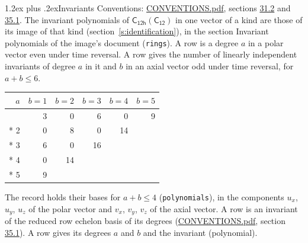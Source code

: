 \documentclass[10pt,a4paper]{article}
\makeatletter
\renewcommand\section{\@startsection{section}{1}{\z@}{-3ex plus -1ex minus -.2ex}%
  {1.2ex plus .2ex}{\normalfont\large\sffamily\bfseries\color{parttitle}}}
\numberwithin{equation}{section}
\newcommand{\grp}[1]{\mathsf{#1}}
\makeatother
\begin{document}
\section{Invariants}\label{s:invariants}
Conventions: \href{../../CONVENTIONS.pdf}{CONVENTIONS.pdf}, sections \href{../../CONVENTIONS.pdf\#conv.31.2}{31.2} and \href{../../CONVENTIONS.pdf\#conv.35.1}{35.1}.
The invariant polynomials of $\grp{C_{12h}}(\grp{C_{12}})$ in one vector of a kind are those of its image of that kind (section~\ref{s:identification}), in the section Invariant polynomials of the image's document (\texttt{rings}).
\leavevmode\label{n:index.degree.polar}\label{n:index.degree.axial}A row is a degree $a$ in a polar vector even under time reversal. A row gives the number of linearly independent invariants of degree $a$ in it and $b$ in an axial vector odd under time reversal, for $a + b \le 6$.
{\small\begin{longtable}{@{}rrrrrr@{}}\toprule
$a$ & $b = 1$ & $b = 2$ & $b = 3$ & $b = 4$ & $b = 5$\\\midrule\endhead
\bottomrule\endfoot\endlastfoot
1 & 3 & 0 & 6 & 0 & 9\\*
2 & 0 & 8 & 0 & 14 & \\*
3 & 6 & 0 & 16 &  & \\*
4 & 0 & 14 &  &  & \\*
5 & 9 &  &  &  & \\
\bottomrule\end{longtable}}
\leavevmode\label{n:local.component.polar}\label{n:local.component.axial}The record holds their bases for $a + b \le 4$ (\texttt{polynomials}), in the components $u_{x}$, $u_{y}$, $u_{z}$ of the polar vector and $v_{x}$, $v_{y}$, $v_{z}$ of the axial vector. \label{n:head.polynomial}A row is an invariant of the reduced row echelon basis of its degrees (\href{../../CONVENTIONS.pdf}{CONVENTIONS.pdf}, section \href{../../CONVENTIONS.pdf\#conv.35.1}{35.1}). A row gives its degrees $a$ and $b$ and the invariant (polynomial).
\end{document}
